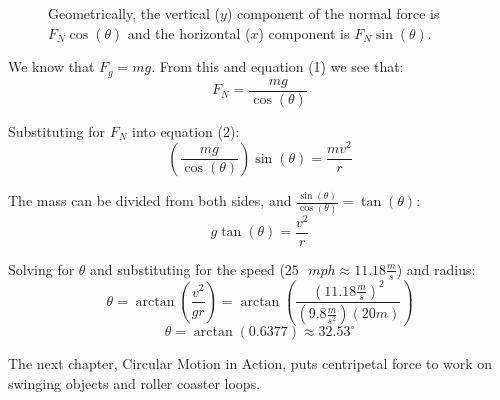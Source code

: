 \begin{figure}
  \caption{Geometrically, the vertical ($y$) component of the normal force is $F_N \cos{\left( \theta \right)}$ and the horizontal ($x$) component is $F_N \sin{ \left( \theta \right)}$.}
  \label{fig:banked_component}
\end{figure}

We know that $F_g = mg$. From this and equation (1) we see that:
$$F_N = \frac{mg}{\cos{ \left( \theta \right)}}$$

Substituting for $F_N$ into equation (2):
$$\left( \frac{mg}{\cos{ \left( \theta \right)}} \right) \sin{ \left( \theta \right)} = \frac{mv^2}{r}$$

The mass can be divided from both sides, and $\frac{\sin{ \left( \theta \right)}}{\cos{ \left( \theta \right)}} = \tan{ \left( \theta \right)}$:
$$g \tan{ \left( \theta \right)} = \frac{v^2}{r}$$

Solving for $\theta$ and substituting for the speed ($25 \text{ }mph \approx 11.18 \frac{m}{s}$) and radius:
$$\theta = \arctan{ \left( \frac{v^2}{gr} \right)} = \arctan{ \left( \frac{\left( 11.18 \frac{m}{s} \right)^2}{\left( 9.8 \frac{m}{s^2} \right) \left( 20 m \right)} \right)}$$
$$\theta = \arctan{ \left( 0.6377 \right) } \approx 32.53 ^{\circ}$$

The next chapter, Circular Motion in Action, puts centripetal force to work on swinging objects and roller
coaster loops.

